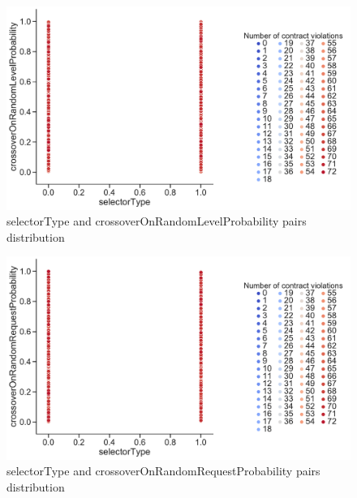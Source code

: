 \begin{figure}
	\centering
	\includegraphics[width=\textwidth]{images/PairsDistr/selectorType_crossoverOnRandomLevelProbability.pdf}
	\caption[selectorType and crossoverOnRandomLevelProbability pairs distribution]{selectorType and crossoverOnRandomLevelProbability pairs distribution}
	\label{fig:selectorType_crossoverOnRandomLevelProbability_pair}
\end{figure}
\clearpage
\begin{figure}
	\centering
	\includegraphics[width=\textwidth]{images/PairsDistr/selectorType_crossoverOnRandomRequestProbability.pdf}
	\caption[selectorType and crossoverOnRandomRequestProbability pairs distribution]{selectorType and crossoverOnRandomRequestProbability pairs distribution}
	\label{fig:selectorType_crossoverOnRandomRequestProbability_pair}
\end{figure}
\clearpage
